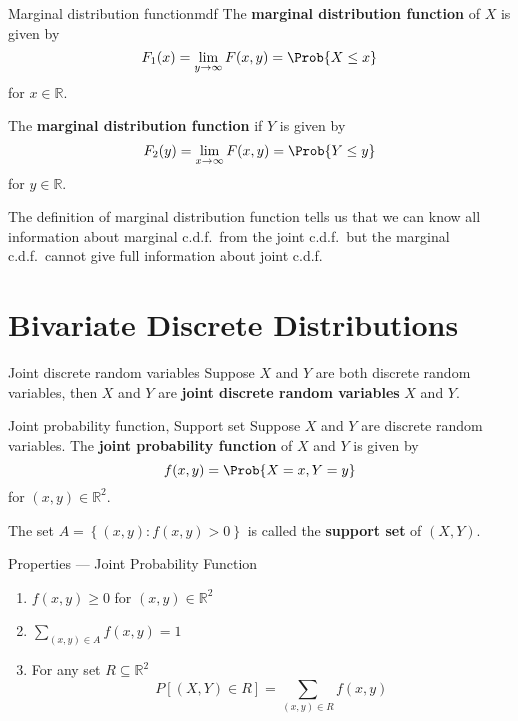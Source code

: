 \begin{Definition}{Marginal distribution function}{mdf}
    The \textbf{marginal distribution function} of $ X $ is given by
    \[ F_1(x)=\lim\limits_{{y} \to {\infty}} F(x,y)=\Prob{X\le x} \]
    for $ x\in\mathbb{R} $.

    The \textbf{marginal distribution function} if $ Y $ is given by
    \[ F_2(y)=\lim\limits_{{x} \to {\infty}} F(x,y)=\Prob{Y\le y} \]
    for $ y\in\mathbb{R} $.
\end{Definition}
\begin{Remark}{}{}
    The definition of marginal distribution
    function tells us that we can know all information
    about marginal c.d.f.\ from the joint c.d.f.\ but the
    marginal c.d.f.\ cannot give full information about
    joint c.d.f.\
\end{Remark}
\section{Bivariate Discrete Distributions}
\begin{Definition}{Joint discrete random variables}{}
    Suppose $ X $ and $ Y $ are both discrete random variables,
    then $ X $ and $ Y $ are \textbf{joint discrete random variables}
    $ X $ and $ Y $.
\end{Definition}

\begin{Definition}{Joint probability function, Support set}{}
    Suppose $ X $ and $ Y $ are discrete random variables.
    The \textbf{joint probability function} of $ X $ and $ Y $
    is given by
    \[ f(x,y)=\Prob{X=x,Y=y} \]
    for $ (x,y)\in\mathbb{R}^2 $.

    The set $ A=\left\{ (x,y):f(x,y)>0 \right\} $ is called
    the \textbf{support set} of $ (X,Y) $.
\end{Definition}

\begin{Definition}{Properties --- Joint Probability Function}{}
    \begin{enumerate}[label=(\Roman*)]
        \item $ f(x,y)\ge 0 $ for $ (x,y)\in\mathbb{R}^2 $
        \item $ \displaystyle \sum\limits_{(x,y)\in A}
                  f(x,y)=1 $
        \item For any set $ R\subseteq \mathbb{R}^2 $
              \[ P\left[ (X,Y)\in R \right]
                  =\sum\limits_{(x,y)\in R}f(x,y)  \]
    \end{enumerate}
\end{Definition}

